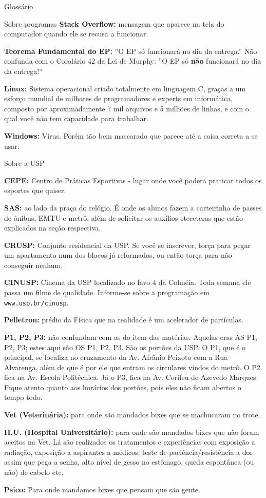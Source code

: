 \begin{secao}{Glossário}
\begin{subsecao}{Sobre programas}
{\bf Stack Overflow:} mensagem que aparece na tela do computador
quando ele se recusa a funcionar.

{\bf Teorema Fundamental do EP:} ''O EP só funcionará no dia da entrega.'' Não
confunda com o Corolário 42 da Lei de Murphy: ''O EP só {\bf não} funcionará no
dia da entrega!''

{\bf Linux:} Sistema operacional criado totalmente em linguagem C, graças a um
esforço mundial de milhares de programadores e experts em informática, composto
por aproximadamente 7 mil arquivos e 5 milhões de linhas, e com o qual você não
tem capacidade para trabalhar.

{\bf Windows:} Vírus. Porém tão bem mascarado que parece até a coisa correta a
se usar.
\end{subsecao}

\begin{subsecao}{Sobre a USP}

{\bf CEPE:} Centro de Práticas Esportivas - lugar onde você poderá praticar
todos os esportes que quiser.

{\bf SAS:} ao lado da praça do relógio. É onde os alunos fazem a carteirinha
de passes de ônibus, EMTU e metrô, além de solicitar os auxílios eteceteras que
estão explicados na seção respectiva.

{\bf CRUSP:} Conjunto residencial da USP. Se você se inscrever, torça para
pegar um apartamento num dos blocos já reformados, ou então torça para não
conseguir nenhum.



{\bf CINUSP:} Cinema da USP localizado no favo 4 da Colméia. Toda semana ele
passa um filme de qualidade. Informe-se sobre a programação em {\tt www.usp.br/cinusp}.

{\bf Pelletron:} prédio da Física que na realidade é um acelerador de
partículas.

{\bf P1, P2, P3:} não confundam com as do item das matérias. Aquelas eras AS P1, P2, P3;
estes aqui são OS P1, P2, P3. São os portões da USP. O P1, que é o principal, se localiza
no cruzamento da Av. Afrânio Peixoto com a Rua Alvarenga, além de que é por ele que
entram os circulares vindos do metrô. O P2 fica na Av. Escola Politécnica. Já o P3,
fica na Av. Corifeu de Azevedo Marques. Fique atento quanto aos horários dos portões,
pois eles não ficam abertos o tempo todo.

{\bf Vet (Veterinária):} para onde são mandados bixes que se machucaram no
trote.

{\bf H.U. (Hospital Universitário):} para onde são mandados bixes que não
foram aceitos na Vet. Lá são realizados os tratamentos e experiências com
exposição a radiação, exposição a aspirantes a médicos, teste de
paciência/resistência a dor assim que pega a senha, alto nível de gesso no
estômago, queda espontânea (ou não) de cabelo etc.

{\bf Psico:} Para onde mandamos bixes que pensam que são gente.

\end{subsecao}
\end{secao}
